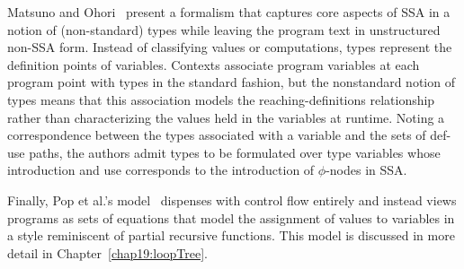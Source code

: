 Matsuno and Ohori~\cite{DBLP:conf/ppdp/MatsunoO06} present a formalism
that captures core aspects of SSA in a notion of (non-standard) types
while leaving the program text in unstructured non-SSA form. Instead
of classifying values or computations, types represent the definition
points of variables. Contexts associate program variables at each
program point with types in the standard fashion, but the nonstandard
notion of types means that this association models the
reaching-definitions relationship rather than characterizing the
values held in the variables at runtime.  Noting a correspondence
between the types associated with a variable and the sets of def-use
paths, the authors admit types to be formulated over type variables
whose introduction and use corresponds to the introduction of
$\phi$-nodes in SSA.

Finally, Pop et al.'s model~\cite{PopJS2007} dispenses with control
flow entirely and instead views programs as sets of equations that
model the assignment of values to variables in a style reminiscent of
partial recursive functions. This model is discussed in more detail in
Chapter~\ref{chap19:loopTree}.


